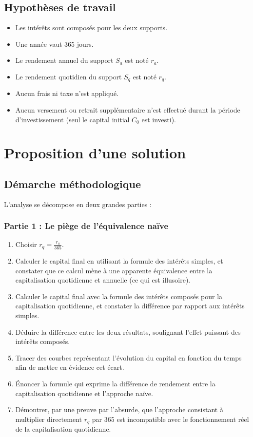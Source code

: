 \documentclass{article}
\begin{document}
\subsection{Hypothèses de travail}
\begin{itemize}
\item Les intérêts sont composés pour les deux supports.
\item Une année vaut 365 jours.
\item Le rendement annuel du support $S_a$ est noté $r_a$.
\item Le rendement quotidien du support $S_q$ est noté $r_q$.
\item Aucun frais ni taxe n'est appliqué.
\item Aucun versement ou retrait supplémentaire n’est effectué durant la période d'investissement (seul le capital initial $C_0$ est investi).
\end{itemize}

\section{Proposition d'une solution}
\subsection{Démarche méthodologique}
L'analyse se décompose en deux grandes parties :

\subsubsection*{Partie 1 : Le piège de l'équivalence naïve}
\begin{enumerate}
    \item Choisir \( r_q = \frac{r_a}{365} \).
    \item Calculer le capital final en utilisant la formule des intérêts simples, et constater que ce calcul mène à une apparente équivalence entre la capitalisation quotidienne et annuelle (ce qui est illusoire).
    \item Calculer le capital final avec la formule des intérêts composés pour la capitalisation quotidienne, et constater la différence par rapport aux intérêts simples.
    \item Déduire la différence entre les deux résultats, soulignant l'effet puissant des intérêts composés.
    \item Tracer des courbes représentant l'évolution du capital en fonction du temps afin de mettre en évidence cet écart.
    \item Énoncer la formule qui exprime la différence de rendement entre la capitalisation quotidienne et l'approche naïve.
    \item Démontrer, par une preuve par l'absurde, que l'approche consistant à multiplier directement \( r_q \) par 365 est incompatible avec le fonctionnement réel de la capitalisation quotidienne.
\end{enumerate}
\end{document}
